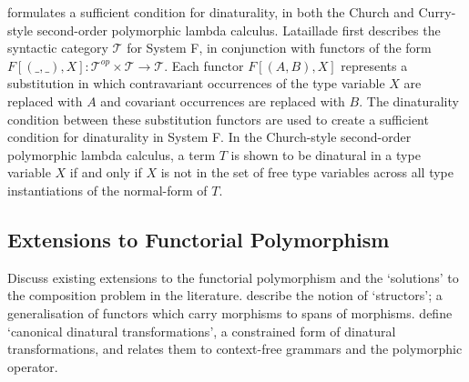\documentclass[../../Dissertation.tex]{subfiles}
\begin{document}
 formulates a sufficient condition for dinaturality, in both the Church and Curry-style second-order polymorphic lambda calculus. Lataillade first describes the syntactic category $\mathcal{T}$ for System F, in conjunction with
functors of the form $F[(\_,\_),X] : \mathcal{T}^{op} \times \mathcal{T} \rightarrow \mathcal{T}$. Each functor $F[(A,B),X]$ represents a substitution in which contravariant occurrences of the type variable $X$ are replaced with $A$ and covariant occurrences are replaced with $B$. The dinaturality condition between these substitution functors are used to create a sufficient condition for dinaturality in System F. In the Church-style second-order polymorphic lambda calculus, a term $T$ is shown to be dinatural in a type variable $X$ if and only if $X$ is not in the set of free type variables across all type instantiations of the normal-form of $T$.

\subsection{Extensions to Functorial Polymorphism}
Discuss existing extensions to the functorial polymorphism and the `solutions' to the composition problem in the literature.
\newline\newline
{} describe the notion of `structors'; a generalisation of functors which carry morphisms to spans of morphisms.
\newline\newline
{} define `canonical dinatural transformations', a constrained form of dinatural transformations, and relates them to context-free grammars and the polymorphic operator.
\end{document}
